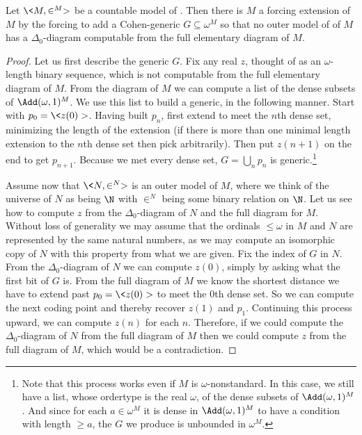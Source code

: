 \documentclass{amsart}
\begin{document}
 \begin{theorem}
 Let $\<M,\in^M>$ be a countable model of \ZF. Then there is $M$ a forcing extension of $M$ by the forcing to add a Cohen-generic $G \subseteq \omega^M$ so that no outer model of of $M$ has a $\Delta_0$-diagram computable from the full elementary diagram of $M$.
 \end{theorem}
 
 \begin{proof}
 Let us first describe the generic $G$. Fix any real $z$, thought of as an $\omega$-length binary sequence, which is not computable from the full elementary diagram of $M$. From the diagram of $M$ we can compute a list of the dense subsets of $\Add(\omega,1)^M$. We use this list to build a generic, in the following manner. Start with $p_0 = \<z(0)>$. Having built $p_n$, first extend to meet the $n$th dense set, minimizing the length of the extension (if there is more than one minimal length extension to the $n$th dense set then pick arbitrarily). Then put $z(n+1)$ on the end to get $p_{n+1}$. Because we met every dense set, $G = \bigcup_n p_n$ is generic.\footnote{Note that this process works even if $M$ is $\omega$-nonstandard. In this case, we still have a list, whose ordertype is the real $\omega$, of the dense subsets of $\Add(\omega,1)^M$. And since for each $a \in \omega^M$ it is dense in $\Add(\omega,1)^M$ to have a condition with length $\ge a$, the $G$ we produce is unbounded in $\omega^M$.}
 
 Assume now that $\<N,\in^N>$ is an outer model of $M$, where we think of the universe of $N$ as being $\N$ with $\in^N$ being some binary relation on $\N$. Let us see how to compute $z$ from the $\Delta_0$-diagram of $N$ and the full diagram for $M$. Without loss of generality we may assume that the ordinals $\le \omega$ in $M$ and $N$ are represented by the same natural numbers, as we may compute an isomorphic copy of $N$ with this property from what we are given. Fix the index of $G$ in $N$. From the $\Delta_0$-diagram of $N$ we can compute $z(0)$, simply by asking what the first bit of $G$ is. From the full diagram of $M$ we know the shortest distance we have to extend past $p_0 = \<z(0)>$ to meet the $0$th dense set. So we can compute the next coding point and thereby recover $z(1)$ and $p_1$. Continuing this process upward, we can compute $z(n)$ for each $n$. Therefore, if we could compute the $\Delta_0$-diagram of $N$ from the full diagram of $M$ then we could compute $z$ from the full diagram of $M$, which would be a contradiction.
 \end{proof}
 
\end{document}
